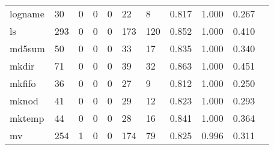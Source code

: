 \begin{longtable}{lp{1.10cm}p{1.10cm}p{1.10cm}p{1.10cm}p{1.10cm}p{1.10cm}p{1.10cm}p{1.10cm}p{1.10cm}p{1.10cm}}
logname   &                     30 &                                  0 &                                 0 &                                0 &                                22 &                               8 &                          0.817 &                                 1.000 &                               0.267 \\
ls        &                    293 &                                  0 &                                 0 &                                0 &                               173 &                             120 &                          0.852 &                                 1.000 &                               0.410 \\
md5sum    &                     50 &                                  0 &                                 0 &                                0 &                                33 &                              17 &                          0.835 &                                 1.000 &                               0.340 \\
mkdir     &                     71 &                                  0 &                                 0 &                                0 &                                39 &                              32 &                          0.863 &                                 1.000 &                               0.451 \\
mkfifo    &                     36 &                                  0 &                                 0 &                                0 &                                27 &                               9 &                          0.812 &                                 1.000 &                               0.250 \\
mknod     &                     41 &                                  0 &                                 0 &                                0 &                                29 &                              12 &                          0.823 &                                 1.000 &                               0.293 \\
mktemp    &                     44 &                                  0 &                                 0 &                                0 &                                28 &                              16 &                          0.841 &                                 1.000 &                               0.364 \\
mv        &                    254 &                                  1 &                                 0 &                                0 &                               174 &                              79 &                          0.825 &                                 0.996 &                               0.311 \\

\end{longtable}
